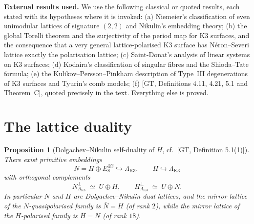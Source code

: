 \documentclass[11pt]{article}
\newtheorem{proposition}[theorem]{Proposition}
\begin{document}
\medskip

\noindent\textbf{External results used.} We use the following classical or
quoted results, each stated with its hypotheses where it is invoked:
(a) Niemeier's classification of even unimodular lattices of signature
$(2,2)$ and Nikulin's embedding theory; (b) the global Torelli theorem and
the surjectivity of the period map for K3 surfaces, and the consequence
that a very general lattice-polarised K3 surface has N\'eron--Severi lattice
exactly the polarisation lattice; (c) Saint-Donat's analysis of linear
systems on K3 surfaces; (d) Kodaira's classification of singular fibres and
the Shioda--Tate formula; (e) the Kulikov--Persson--Pinkham description of
Type~III degenerations of K3 surfaces and Tyurin's comb models; (f)
[GT, Definitions 4.11, 4.21, 5.1 and Theorem~C], quoted precisely in the
text. Everything else is proved.


\section{The lattice duality}\label{sec:lattice-duality}

\begin{proposition}[Dolgachev--Nikulin self-duality of $H$,
{cf.\ [GT, Definition 5.1(1)]}]\label{prop:DN}
There exist primitive embeddings
\[
N=H\oplus E_8^{\oplus 2}\hookrightarrow\Lambda_{\mathrm{K3}},
\qquad
H\hookrightarrow\Lambda_{\mathrm{K3}}
\]
with orthogonal complements
\[
N^{\perp}_{\Lambda_{\mathrm{K3}}}\;\simeq\;U\oplus H,
\qquad
H^{\perp}_{\Lambda_{\mathrm{K3}}}\;\simeq\;U\oplus N.
\]
In particular $N$ and $H$ are Dolgachev--Nikulin dual lattices, and the
mirror lattice of the $N$-quasipolarised family is $\bar N=H$ (of rank
$2$), while the mirror lattice of the $H$-polarised family is
$\bar H = N$ (of rank $18$).
\end{proposition}
\end{document}
